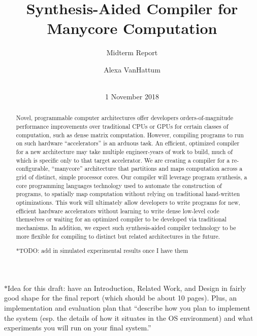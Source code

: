 \documentclass{sig-alternate-05-2015}
\newcommand{\note}{\color{red}$*$}
\begin{document}

\title{Synthesis-Aided Compiler for Manycore Computation}
\subtitle{Midterm Report}

\author{
\alignauthor
Alexa VanHattum\\
       \\
}
\date{1 November 2018}

\maketitle

{\note Idea for this draft: have an Introduction, Related Work, and Design in fairly good shape for the final report (which should be about 10 pages). Plus, an implementation and evaluation plan that ``describe how you plan to implement the system (esp. the details of how it situates in the OS environment) and what experiments you will run on your final system.'' }
\begin{abstract}

Novel, programmable computer architectures offer developers orders-of-magnitude performance improvements over traditional CPUs or GPUs for certain classes of computation, such as dense matrix computation. However, compiling programs to run on such hardware ``accelerators'' is an arduous task. An efficient, optimized compiler for a new architecture may take multiple engineer-years of work to build, much of which is specific only to that target accelerator. We are creating a compiler for a re-configurable, ``manycore'' architecture that partitions and maps computation across a grid of distinct, simple processor cores. Our compiler will leverage program synthesis, a core programming languages technology used to automate the construction of programs, to spatially map computation without relying on traditional hand-written optimizations. This work will ultimately allow developers to write programs for new, efficient hardware accelerators without learning to write dense low-level code themselves or waiting for an optimized compiler to be developed via traditional mechanisms. In addition, we expect such synthesis-aided compiler technology to be more flexible for compiling to distinct but related architectures in the future.

{\note TODO: add in simulated experimental results once I have them} 

\end{abstract}
\end{document}
